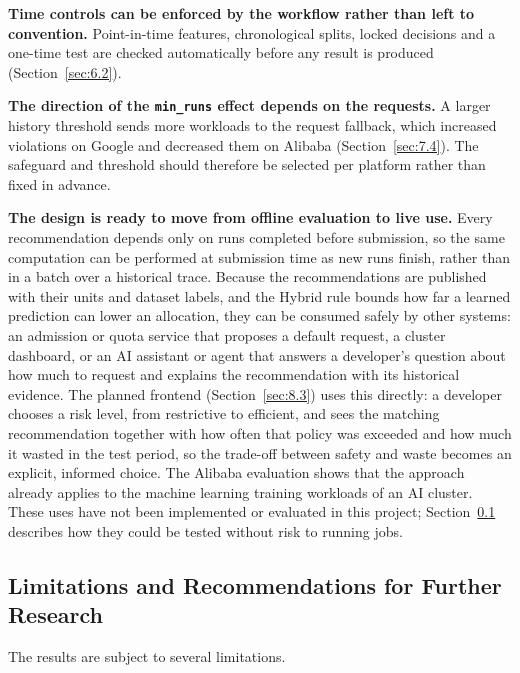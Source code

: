 \documentclass{IEEEtran}
\begin{document}
\textbf{Time controls can be enforced by the workflow rather than left to convention.} Point-in-time features, chronological splits, locked decisions and a one-time test are checked automatically before any result is produced (Section~\ref{sec:6.2}).

\textbf{The direction of the \texttt{min\_runs} effect depends on the requests.} A larger history threshold sends more workloads to the request fallback, which increased violations on Google and decreased them on Alibaba (Section~\ref{sec:7.4}). The safeguard and threshold should therefore be selected per platform rather than fixed in advance.

\textbf{The design is ready to move from offline evaluation to live use.} Every recommendation depends only on runs completed before submission, so the same computation can be performed at submission time as new runs finish, rather than in a batch over a historical trace. Because the recommendations are published with their units and dataset labels, and the Hybrid rule bounds how far a learned prediction can lower an allocation, they can be consumed safely by other systems: an admission or quota service that proposes a default request, a cluster dashboard, or an AI assistant or agent that answers a developer's question about how much to request and explains the recommendation with its historical evidence. The planned frontend (Section~\ref{sec:8.3}) uses this directly: a developer chooses a risk level, from restrictive to efficient, and sees the matching recommendation together with how often that policy was exceeded and how much it wasted in the test period, so the trade-off between safety and waste becomes an explicit, informed choice. The Alibaba evaluation shows that the approach already applies to the machine learning training workloads of an AI cluster. These uses have not been implemented or evaluated in this project; Section~\ref{sec:9.3} describes how they could be tested without risk to running jobs.

\subsection{Limitations and Recommendations for Further Research}\label{sec:9.3}

The results are subject to several limitations.
\end{document}
